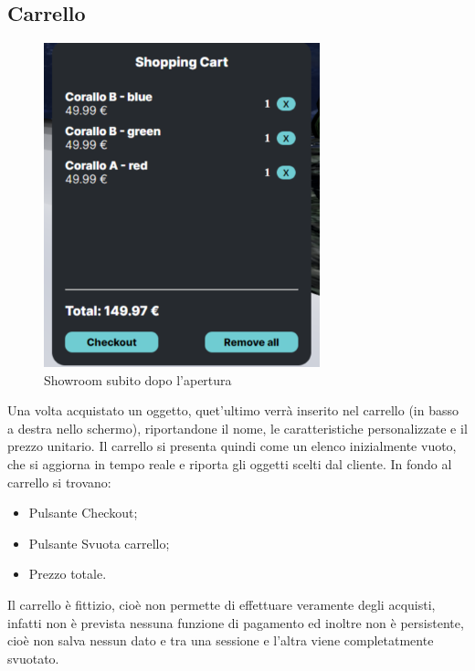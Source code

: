 \subsection{Carrello}
\begin{figure}[H]
  \renewcommand{\thefigure}{2}
\begin{center}
  \includegraphics[width=8cm]{./res/images/carrello.png}
\end{center}
  \caption{Showroom subito dopo l'apertura}
  \label{Showroom subito dopo l'apertura}
\end{figure}

Una volta acquistato un oggetto, quet'ultimo verrà inserito nel carrello (in basso a destra nello schermo), riportandone il nome, le caratteristiche personalizzate e il prezzo unitario.
Il carrello si presenta quindi come un elenco inizialmente vuoto, che si aggiorna in tempo reale e riporta gli oggetti scelti dal cliente.
In fondo al carrello si trovano:
\begin{itemize}
	\item Pulsante Checkout;
	\item Pulsante Svuota carrello;
	\item Prezzo totale.
\end{itemize}
Il carrello è fittizio, cioè non permette di effettuare veramente degli acquisti, infatti non è prevista nessuna funzione di pagamento ed inoltre non è persistente, cioè non salva nessun dato e tra una sessione e l'altra viene completatmente svuotato.
\pagebreak

